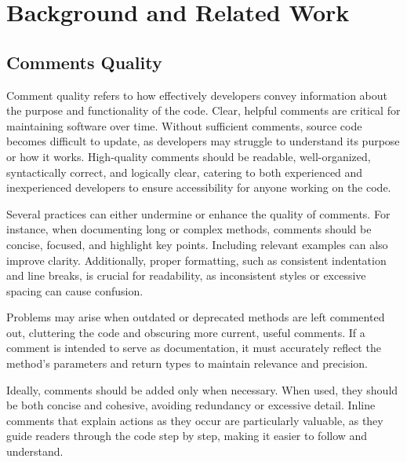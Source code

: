 
\chapter{Background and Related Work} %

\label{Chapter2} 

\section{Comments Quality}

Comment quality refers to how effectively developers convey information about the purpose and functionality of the code. Clear, helpful comments are critical for maintaining software over time. Without sufficient comments, source code becomes difficult to update, as developers may struggle to understand its purpose or how it works. High-quality comments should be readable, well-organized, syntactically correct, and logically clear, catering to both experienced and inexperienced developers to ensure accessibility for anyone working on the code.

\noindent Several practices can either undermine or enhance the quality of comments. For instance, when documenting long or complex methods, comments should be concise, focused, and highlight key points. Including relevant examples can also improve clarity. Additionally, proper formatting, such as consistent indentation and line breaks, is crucial for readability, as inconsistent styles or excessive spacing can cause confusion.

\noindent Problems may arise when outdated or deprecated methods are left commented out, cluttering the code and obscuring more current, useful comments. If a comment is intended to serve as documentation, it must accurately reflect the method's parameters and return types to maintain relevance and precision.

\noindent Ideally, comments should be added only when necessary. When used, they should be both concise and cohesive, avoiding redundancy or excessive detail. Inline comments that explain actions as they occur are particularly valuable, as they guide readers through the code step by step, making it easier to follow and understand.

